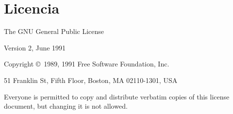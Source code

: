 \documentclass[a4paper]{article}
\begin{document}
    \tableofcontents
    \listoffigures
    \newpage

    \section{Licencia}

\begin{center}
{\parindent 0in
The GNU General Public License

Version 2, June 1991

Copyright \copyright\ 1989, 1991 Free Software Foundation, Inc.

\bigskip

51 Franklin St, Fifth Floor, Boston, MA  02110-1301, USA

\bigskip

Everyone is permitted to copy and distribute verbatim copies
of this license document, but changing it is not allowed.
}
\end{center}
\end{document}
